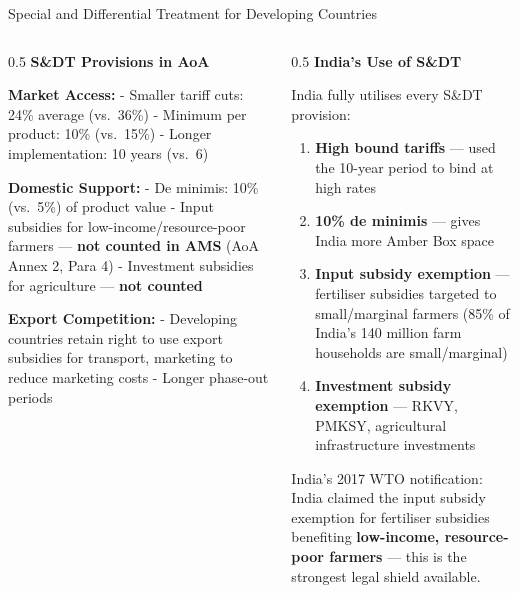 \documentclass[
  ignorenonframetext,
  aspectratio=169,
]{beamer}
\makeatletter
\providecommand{\tightlist}{%
  \setlength{\itemsep}{0pt}\setlength{\parskip}{0pt}}
\let\quarto@originallabel\label
\DeclareRobustCommand*{\label}[1]{\quarto@originallabel{#1}}
\makeatother
\begin{document}
\begin{frame}{Special and Differential Treatment for Developing
Countries}
\label{special-and-differential-treatment-for-developing-countries}
\begin{columns}[T]
\begin{column}{0.5\linewidth}
\textbf{S\&DT Provisions in AoA}

\textbf{Market Access:} - Smaller tariff cuts: 24\% average (vs.~36\%) -
Minimum per product: 10\% (vs.~15\%) - Longer implementation: 10 years
(vs.~6)

\textbf{Domestic Support:} - De minimis: 10\% (vs.~5\%) of product value
- Input subsidies for low-income/resource-poor farmers --- \textbf{not
counted in AMS} (AoA Annex 2, Para 4) - Investment subsidies for
agriculture --- \textbf{not counted}

\textbf{Export Competition:} - Developing countries retain right to use
export subsidies for transport, marketing to reduce marketing costs -
Longer phase-out periods
\end{column}

\begin{column}{0.5\linewidth}
\textbf{India's Use of S\&DT}

India fully utilises every S\&DT provision:

\begin{enumerate}
\tightlist
\item
  \textbf{High bound tariffs} --- used the 10-year period to bind at
  high rates
\item
  \textbf{10\% de minimis} --- gives India more Amber Box space
\item
  \textbf{Input subsidy exemption} --- fertiliser subsidies targeted to
  small/marginal farmers (85\% of India's 140 million farm households
  are small/marginal)
\item
  \textbf{Investment subsidy exemption} --- RKVY, PMKSY, agricultural
  infrastructure investments
\end{enumerate}

India's 2017 WTO notification: India claimed the input subsidy exemption
for fertiliser subsidies benefiting \textbf{low-income, resource-poor
farmers} --- this is the strongest legal shield available.
\end{column}
\end{columns}
\end{frame}
\end{document}
